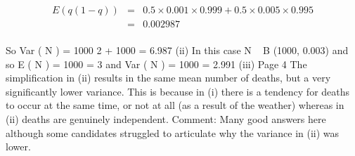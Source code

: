 \documentclass[a4paper,12pt]{article}
\begin{document}
\begin{eqnarray*}
E ( q (1 − q )) &=&  0.5 \times 0.001 \times 0.999 + 0.5 \times 0.005 \times 0.995 \\ &=&  0.002987  \\
\end{eqnarray*}



So Var ( N ) = 1000 2  + 1000  = 6.987
(ii)
In this case N ~ B (1000, 0.003) and so
E ( N ) = 1000  = 3
and
Var ( N ) = 1000   = 2.991
(iii)
Page 4
The simplification in (ii) results in the same mean number of deaths, but a
very significantly lower variance.%
This is because in (i) there is a tendency for deaths to occur at the same time,
or not at all (as a result of the weather) whereas in (ii) deaths are genuinely
independent.
Comment: Many good answers here although some candidates struggled to articulate why
the variance in (ii) was lower.
\end{document}
